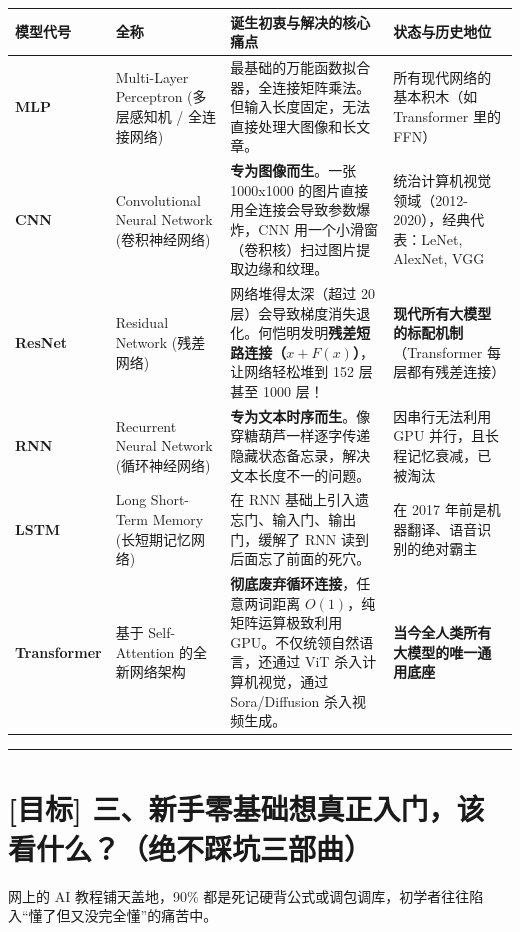 \begin{center}
\small
\begin{tabularx}{\textwidth}{p{2.5cm} p{3.5cm} X X}
\toprule
\textbf{模型代号} & \textbf{全称} & \textbf{诞生初衷与解决的核心痛点} & \textbf{状态与历史地位} \\
\midrule
\textbf{MLP} & Multi-Layer Perceptron (多层感知机 / 全连接网络) & 最基础的万能函数拟合器，全连接矩阵乘法。但输入长度固定，无法直接处理大图像和长文章。 & 所有现代网络的基本积木（如 Transformer 里的 FFN） \\
\textbf{CNN} & Convolutional Neural Network (卷积神经网络) & \textbf{专为图像而生}。一张 1000x1000 的图片直接用全连接会导致参数爆炸，CNN 用一个小滑窗（卷积核）扫过图片提取边缘和纹理。 & 统治计算机视觉领域（2012-2020），经典代表：LeNet, AlexNet, VGG \\
\textbf{ResNet} & Residual Network (残差网络) & 网络堆得太深（超过 20 层）会导致梯度消失退化。何恺明发明\textbf{残差短路连接（$x + F(x)$）}，让网络轻松堆到 152 层甚至 1000 层！ & \textbf{现代所有大模型的标配机制}（Transformer 每层都有残差连接） \\
\textbf{RNN} & Recurrent Neural Network (循环神经网络) & \textbf{专为文本时序而生}。像穿糖葫芦一样逐字传递隐藏状态备忘录，解决文本长度不一的问题。 & 因串行无法利用 GPU 并行，且长程记忆衰减，已被淘汰 \\
\textbf{LSTM} & Long Short-Term Memory (长短期记忆网络) & 在 RNN 基础上引入遗忘门、输入门、输出门，缓解了 RNN 读到后面忘了前面的死穴。 & 在 2017 年前是机器翻译、语音识别的绝对霸主 \\
\textbf{Transformer} & 基于 Self-Attention 的全新网络架构 & \textbf{彻底废弃循环连接}，任意两词距离 $O(1)$，纯矩阵运算极致利用 GPU。不仅统领自然语言，还通过 ViT 杀入计算机视觉，通过 Sora/Diffusion 杀入视频生成。 & \textbf{当今全人类所有大模型的唯一通用底座} \\
\bottomrule
\end{tabularx}
\end{center}

\vspace{0.8em}\hrule\vspace{0.8em}

\section{[目标] 三、新手零基础想真正入门，该看什么？（绝不踩坑三部曲）}

网上的 AI 教程铺天盖地，90\% 都是死记硬背公式或调包调库，初学者往往陷入“懂了但又没完全懂”的痛苦中。

